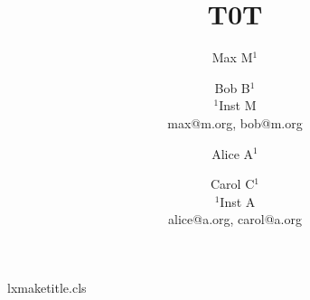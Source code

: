 \begin{filecontents*}[overwrite]{lxmaketitle.cls}
\renewcommand\maketitle{\par}
\end{filecontents*}
\documentclass{lxmaketitle}

\title{T0}\author{Max M$^{1}$ \and Bob B$^{1}$\\ $^{1}$Inst M\\ max@m.org, bob@m.org}\maketitle
\title{T}\author{Alice A$^{1}$ \and Carol C$^{1}$\\ $^{1}$Inst A\\ alice@a.org, carol@a.org}\maketitle
Body.


